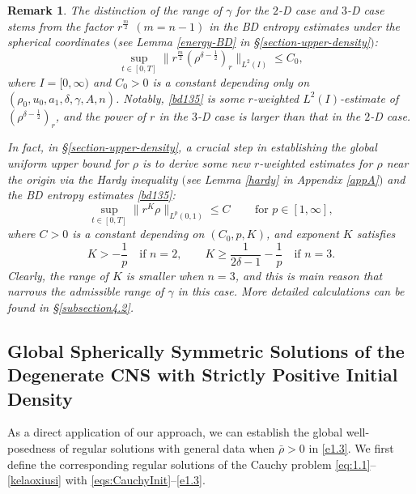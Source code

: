 \documentclass[11pt,reqno]{amsart}
\newtheorem{rk}{Remark}
\numberwithin{rk}{section}
\numberwithin{prop}{section}
\numberwithin{mydef}{section}
\numberwithin{lem}{section}
\numberwithin{equation}{section}
\numberwithin{thm}{section}
\begin{document}
\begin{rk}
The distinction of the range of $\gamma$ for the $2$-{\rm D} case and $3$-{\rm D} case stems from the factor $r^\frac{m}{2}$ $(m=n-1)$ in the BD entropy estimates under the spherical coordinates $($see {\rm Lemma \ref{energy-BD}} in {\rm \S\ref{section-upper-density}}$)${\rm :} 
\begin{equation}\label{bd135}
\sup_{t\in[0,T]}\big\|r^{\frac{m}{2}}(\rho^{\delta-\frac{1}{2}})_r\big\|_{L^2(I)} \leq C_0, 
\end{equation}
where $I=[0,\infty)$ and $C_0>0$ is a constant depending only on $(\rho_0,u_0,a_1,\delta,\gamma,A,n)$. Notably, \eqref{bd135} is some $r$-weighted $L^2(I)$-estimate of $(\rho^{\delta-\frac{1}{2}})_r$, 
and the power of $r$ in the $3$-{\rm D} case is larger than 
that in the $2$-{\rm D} case.  

In fact, in {\rm \S\ref{section-upper-density}}, a crucial step in establishing the global uniform upper bound for $\rho$ is to derive some new $r$-weighted estimates for $\rho$ near the origin via the Hardy inequality $($see {\rm Lemma \ref{hardy}} in {\rm Appendix \ref{appA}}$)$ and the BD entropy estimates \eqref{bd135}{\rm :} 
\begin{equation}\label{314}
\sup_{t\in[0,T]}\|r^K\rho\|_{L^p(0,1)} \leq C \qquad\, \text{for $p\in [1,\infty]$},
\end{equation}
where $C>0$ is a constant depending on $(C_0,p,K)$, and exponent $K$ satisfies
\begin{equation*}
K > -\frac{1}{p} \quad \text{if $n=2$},\qquad K\geq \frac{1}{2\delta-1}-\frac{1}{p}\quad \text{if $n=3$}.
\end{equation*}
Clearly, the range of $K$ is smaller when $n=3$, and this is main reason that narrows the admissible range of $\gamma$ in this case. More detailed calculations can be found in {\rm \S \ref{subsection4.2}}.
\end{rk}

\smallskip
\subsection{Global Spherically Symmetric Solutions of the Degenerate \textbf{CNS} with Strictly Positive Initial Density} 
As a direct application of our approach, we can establish the global well-posedness of regular solutions with general data when $\bar\rho>0$ in \eqref{e1.3}. We first define the corresponding regular solutions of the Cauchy problem \eqref{eq:1.1}--\eqref{kelaoxiusi} with \eqref{eqs:CauchyInit}--\eqref{e1.3}.
\end{document}
